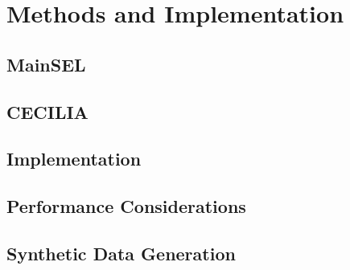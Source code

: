 
\chapter{Methods and Implementation}
  \label{Methods}
\section{\ac{MainSEL}}
\section{\ac{CECILIA}}
\section{Implementation}
\section{Performance Considerations}
\section{Synthetic Data Generation}
